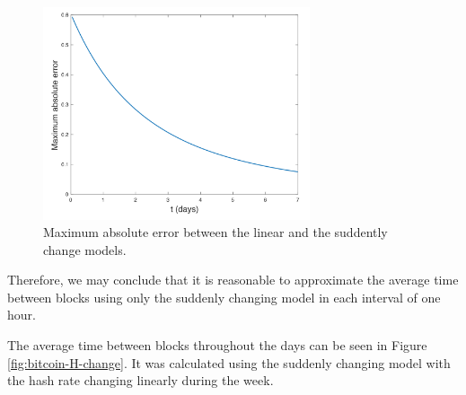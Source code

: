 \begin{figure}[!htb]
\centering \includegraphics[width=0.7\textwidth]{./images01/H-max-abs-error.png}

\caption{Maximum absolute error between the linear and the suddently change models. \label{fig:bitcoin-H-change-error}}
\end{figure}

Therefore, we may conclude that it is reasonable to approximate the average time between blocks using only the suddenly changing model in each interval of one hour.

The average time between blocks throughout the days can be seen in Figure \ref{fig:bitcoin-H-change}. It was calculated using the suddenly changing model with the hash rate changing linearly during the week.

